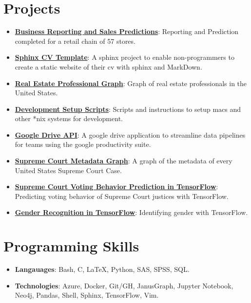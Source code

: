 \documentclass[letterpaper,11pt]{article}
\newcommand{\resumeItem}[2]{
  \item\small{
    \textbf{#1}{: #2 \vspace{-2pt}}
  }
}
\newcommand{\resumeSubItem}[2]{\resumeItem{#1}{#2}\vspace{-4pt}}
\newcommand{\resumeSubHeadingListStart}{\begin{itemize}[leftmargin=*]}
\newcommand{\resumeSubHeadingListEnd}{\end{itemize}}
\begin{document}
\section{Projects}
  \resumeSubHeadingListStart
    \resumeSubItem{\href{https://cv.jnapolitano.io/parts/analysis/business-analysis/index.html}{Business Reporting and Sales Predictions}}
      {Reporting and Prediction completed for a retail chain of 57 stores.}
    \resumeSubItem{\href{https://cv.jnapolitano.io/parts/reference/build-this-site/index.html}{Sphinx CV Template}}
      {A sphinx project to enable non-programmers to create a static website of their cv with sphinx and MarkDown.}
    \resumeSubItem{\href{https://cv.jnapolitano.io/parts/data/graph-database/index.html}{Real Estate Professional Graph}}
      {Graph of real estate professionals in the United States.}
    \resumeSubItem{\href{https://cv.jnapolitano.io/parts/reference/configuration/index.html}{Development Setup Scripts}}
      {Scripts and instructions to  setup macs and other *nix systems for development.}
    \resumeSubItem{\href{https://cv.jnapolitano.io/parts/python-development/google/index.html}{Google Drive API}}
      {A google drive application to streamline data pipelines for teams using the google productivity suite.}
    \resumeSubItem{\href{https://cv.jnapolitano.io/parts/analysis/political-analysis/sup-court/project-sup-court-meta-data-graph/index.html}{Supreme Court Metadata Graph}}
      {A graph of the metadata of every United States Supreme Court Case.}
     \resumeSubItem{\href{https://cv.jnapolitano.io/parts/ml-ai/tensorflow/project-supcourt-tensorflow/index.html}{Supreme Court Voting Behavior Prediction in TensorFlow}}
      {Predicting voting behavior of Supreme Court justices with TensorFlow.}
     \resumeSubItem{\href{https://cv.jnapolitano.io/parts/ml-ai/tensorflow/project-gender-recognition/index.html}{Gender Recognition in TensorFlow}}
      {Identifying gender with TensorFlow.}
  \resumeSubHeadingListEnd


\section{Programming Skills}
  \resumeSubHeadingListStart
    \resumeSubItem{Langauages}
      {Bash, C, LaTeX, Python, SAS, SPSS, SQL.}
     \resumeSubItem{Technologies}
       {Azure, Docker, Git/GH, JanusGraph, Jupyter Notebook, Neo4j, Pandas, Shell, Sphinx, TensorFlow, Vim.}
  \resumeSubHeadingListEnd


\end{document}
